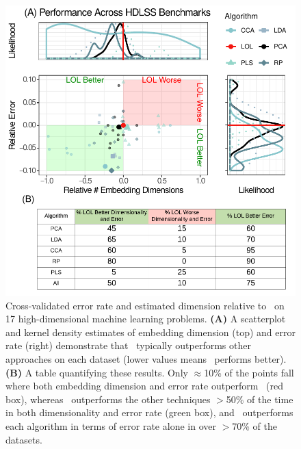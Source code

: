 \documentclass[11pt]{extarticle}
\begin{document}
\begin{figure}[h!]
\centering
\includegraphics[width=0.8\linewidth]{real_data_upd}
\caption{Cross-validated error rate and  estimated dimension relative to \Lol~on 17 high-dimensional machine learning problems.
\textbf{(A)} A scatterplot  and kernel density estimates 
of embedding dimension (top) and error rate (right)
 demonstrate that \Lol~typically outperforms other approaches on each dataset (lower values means \Lol~performs better). 
\textbf{(B)} A table quantifying these results. 
Only $\approx$10\% of the points fall where both embedding dimension and error rate outperform \Lol ~(red box), whereas \Lol~outperforms the other techniques $>$50\% of the time in 
both dimensionality and error rate (green box), and \Lol~outperforms each algorithm in terms of error rate alone in over $>$70\% of the datasets.
}
\label{f:realdata}
\end{figure}
\end{document}
